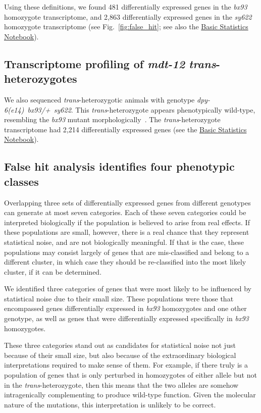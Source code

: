 \documentclass[10pt, twocolumn]{article}
\newcommand{\gene}[1]{\mbox{\emph{#1}}}
\newcommand{\strongn}{2,863}
\newcommand{\weakn}{481}
\newcommand{\transn}{2,214}
\begin{document}
Using these definitions, we found \weakn{} differentially expressed
genes in the  \emph{bx93} homozygote transcriptome, and \strongn{}
differentially expressed genes in the \emph{sy622} homozygote transcriptome
(see Fig.~\ref{fig:false_hit}; see also the
\href{https://wormlabcaltech.github.io/med-cafe/notebook/basic.html}{Basic
Statistics Notebook}).

\subsection*{Transcriptome profiling of \gene{mdt-12}
             \emph{trans}-heterozygotes}
We also sequenced \emph{trans}-heterozygotic animals with genotype
\gene{dpy-6(e14) bx93/+ sy622}. This \emph{trans}-heterozygote appears
phenotypically wild-type, resembling the \emph{bx93} mutant
morphologically~\cite{Moghal2003}. The \emph{trans}-heterozygote transcriptome
had \transn{} differentially expressed genes (see the
\href{https://wormlabcaltech.github.io/med-cafe/notebook/basic.html}{Basic
Statistics Notebook}).

\subsection*{False hit analysis identifies four phenotypic classes}
Overlapping three sets of differentially expressed genes from different
genotypes can generate at most seven categories. Each of these seven categories
could be interpreted biologically if the population is believed to arise from
real effects. If these populations are small, however, there is a real chance
that they represent statistical noise, and are not biologically meaningful.
If that is the case, these populations may consist largely of genes that are
mis-classified and belong to a different cluster, in which case they should be
re-classified into the most likely cluster, if it can be determined.

We identified three categories of genes that were most likely to be influenced
by statistical noise due to their small size. These populations were those that
encompassed genes differentially expressed in  \emph{bx93} homozygotes and one
other genotype, as well as genes that were differentially expressed specifically
in \emph{bx93} homozygotes.

These three categories stand out as candidates for statistical noise not just
because of their small size, but also because of the extraordinary biological
interpretations required to make sense of them. For example, if there truly is
a population of genes that is only perturbed in homozygotes of either allele but
not in the \emph{trans}-heterozygote, then this means that the two alleles are
somehow intragenically complementing to produce wild-type function. Given the
molecular nature of the mutations, this interpretation is unlikely to be correct.
\end{document}
